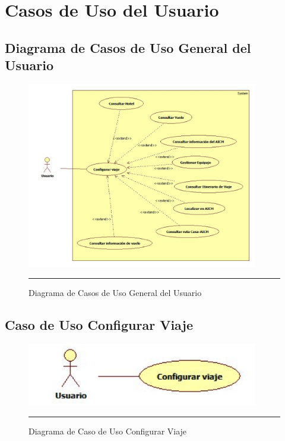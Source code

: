\section{Casos de Uso del Usuario}

\subsection{Diagrama de Casos de Uso General del Usuario}

\begin{figure}[htbp]
	\centering
		\includegraphics[width=0.9\textwidth]{Figuras/cugeneralUsuario.png}
		\rule{30em}{0.5pt}
	\caption[Diagrama de Casos de Uso General del Usuario]{Diagrama de Casos de Uso General del Usuario}
	\label{fig:cuGeneralUsuario}
\end{figure}
\clearpage

\subsection{Caso de Uso Configurar Viaje}

\begin{figure}[htbp]
	\centering
		\includegraphics[width=0.9\textwidth]{Figuras/cuConfigurarViaje.png}
		\rule{30em}{0.5pt}
	\caption[Diagrama de Caso de Uso Configurar Viaje]{Diagrama de Caso de Uso Configurar Viaje}
	\label{fig:cuConfigurarViaje}
\end{figure}

